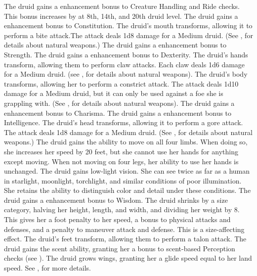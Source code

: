  The druid gains a  enhancement bonus to Creature Handling and Ride checks. This bonus increases by  at 8th, 14th, and 20th druid level.
 The druid gains a  enhancement bonus to Constitution.
 The druid's mouth transforms, allowing it to perform a bite attack.The attack deals 1d8 damage for a Medium druid. (See , for details about natural weapons.)
 The druid gains a  enhancement bonus to Strength.
 The druid gains a  enhancement bonus to Dexterity.
 The druid's hands transform, allowing them to perform claw attacks. Each claw deals 1d6 damage for a Medium druid. (see , for details about natural weapons).
 The druid's body transforms, allowing her to perform a constrict attack. The attack deals 1d10 damage for a Medium druid, but it can only be used against a foe she is grappling with. (See , for details about natural weapons). 
 The druid gains a  enhancement bonus to Charisma.
 The druid gains a  enhancement bonus to Intelligence.
 The druid's head transforms, allowing it to perform a gore attack. The attack deals 1d8 damage for a Medium druid. (See , for details about natural weapons.)
 The druid gains the ability to move on all four limbs. When doing so, she increases her speed by 20 feet, but she cannot use her hands for anything except moving. When not moving on four legs, her ability to use her hands is unchanged.
 The druid gains low-light vision. She can see twice as far as a human in starlight, moonlight, torchlight, and similar conditions of poor illumination. She retains the ability to distinguish color and detail under these conditions.
 The druid gains a  enhancement bonus to Wisdom.
 The druid shrinks by a size category, halving her height, length, and width, and dividing her weight by 8. This gives her a  foot penalty to her speed, a  bonus to physical attacks and defenses, and a  penalty to maneuver attack and defense. This is a size-affecting effect.
 The druid's feet transform, allowing them to perform a talon attack.
 The druid gains the scent ability, granting her a  bonus to scent-based Perception checks (see ).
 The druid grows wings, granting her a glide speed equal to her land speed. See , for more details.
